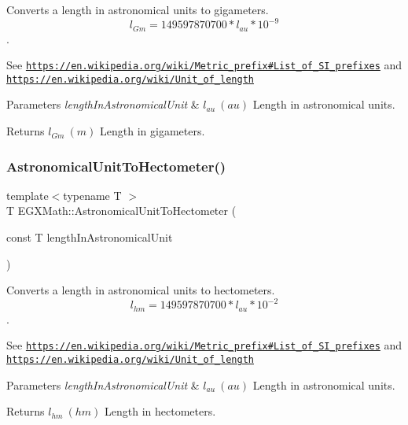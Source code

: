 Converts a length in astronomical units to gigameters. \[ l_{Gm}=149597870700 * l_{au} * 10^{-9} \]. 

See \href{https://en.wikipedia.org/wiki/Metric_prefix#List_of_SI_prefixes}{\tt https\+://en.\+wikipedia.\+org/wiki/\+Metric\+\_\+prefix\#\+List\+\_\+of\+\_\+\+S\+I\+\_\+prefixes} and \href{https://en.wikipedia.org/wiki/Unit_of_length}{\tt https\+://en.\+wikipedia.\+org/wiki/\+Unit\+\_\+of\+\_\+length} 
\begin{DoxyParams}{Parameters}
{\em length\+In\+Astronomical\+Unit} & $ l_{au}\ (au)$ Length in astronomical units. \\
\hline
\end{DoxyParams}
\begin{DoxyReturn}{Returns}
$ l_{Gm}\ (m)$ Length in gigameters. 
\end{DoxyReturn}
\mbox{\label{group___e_g_x_math-_conversions-_length_conversions-_astronomical-_astronomical_unit-_s_i_gab57dd2b64ec8d8e484741dd2459222c7}} 
\subsubsection{\texorpdfstring{Astronomical\+Unit\+To\+Hectometer()}{AstronomicalUnitToHectometer()}}
{\footnotesize\ttfamily template$<$typename T $>$ \\
T E\+G\+X\+Math\+::\+Astronomical\+Unit\+To\+Hectometer (\begin{DoxyParamCaption}\item[{const T}]{length\+In\+Astronomical\+Unit }\end{DoxyParamCaption})}



Converts a length in astronomical units to hectometers. \[ l_{hm}=149597870700 * l_{au} * 10^{-2} \]. 

See \href{https://en.wikipedia.org/wiki/Metric_prefix#List_of_SI_prefixes}{\tt https\+://en.\+wikipedia.\+org/wiki/\+Metric\+\_\+prefix\#\+List\+\_\+of\+\_\+\+S\+I\+\_\+prefixes} and \href{https://en.wikipedia.org/wiki/Unit_of_length}{\tt https\+://en.\+wikipedia.\+org/wiki/\+Unit\+\_\+of\+\_\+length} 
\begin{DoxyParams}{Parameters}
{\em length\+In\+Astronomical\+Unit} & $ l_{au}\ (au)$ Length in astronomical units. \\
\hline
\end{DoxyParams}
\begin{DoxyReturn}{Returns}
$ l_{hm}\ (hm)$ Length in hectometers. 
\end{DoxyReturn}
\mbox{\label{group___e_g_x_math-_conversions-_length_conversions-_astronomical-_astronomical_unit-_s_i_ga54770b9bf59a390a3f60ab04064c4198}} 
